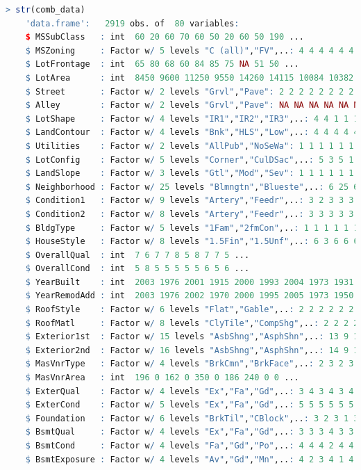 \documentclass[sigconf]{acmart}
\begin{document}
	\begin{lstlisting}[language=R]
	> str(comb_data)
	'data.frame':	2919 obs. of  80 variables:
	$ MSSubClass   : int  60 20 60 70 60 50 20 60 50 190 ...
	$ MSZoning     : Factor w/ 5 levels "C (all)","FV",..: 4 4 4 4 4 4 4 4 5 4 ...
	$ LotFrontage  : int  65 80 68 60 84 85 75 NA 51 50 ...
	$ LotArea      : int  8450 9600 11250 9550 14260 14115 10084 10382 6120 7420 ...
	$ Street       : Factor w/ 2 levels "Grvl","Pave": 2 2 2 2 2 2 2 2 2 2 ...
	$ Alley        : Factor w/ 2 levels "Grvl","Pave": NA NA NA NA NA NA NA NA NA NA ...
	$ LotShape     : Factor w/ 4 levels "IR1","IR2","IR3",..: 4 4 1 1 1 1 4 1 4 4 ...
	$ LandContour  : Factor w/ 4 levels "Bnk","HLS","Low",..: 4 4 4 4 4 4 4 4 4 4 ...
	$ Utilities    : Factor w/ 2 levels "AllPub","NoSeWa": 1 1 1 1 1 1 1 1 1 1 ...
	$ LotConfig    : Factor w/ 5 levels "Corner","CulDSac",..: 5 3 5 1 3 5 5 1 5 1 ...
	$ LandSlope    : Factor w/ 3 levels "Gtl","Mod","Sev": 1 1 1 1 1 1 1 1 1 1 ...
	$ Neighborhood : Factor w/ 25 levels "Blmngtn","Blueste",..: 6 25 6 7 14 12 21 17 18 4 ...
	$ Condition1   : Factor w/ 9 levels "Artery","Feedr",..: 3 2 3 3 3 3 3 5 1 1 ...
	$ Condition2   : Factor w/ 8 levels "Artery","Feedr",..: 3 3 3 3 3 3 3 3 3 1 ...
	$ BldgType     : Factor w/ 5 levels "1Fam","2fmCon",..: 1 1 1 1 1 1 1 1 1 2 ...
	$ HouseStyle   : Factor w/ 8 levels "1.5Fin","1.5Unf",..: 6 3 6 6 6 1 3 6 1 2 ...
	$ OverallQual  : int  7 6 7 7 8 5 8 7 7 5 ...
	$ OverallCond  : int  5 8 5 5 5 5 5 6 5 6 ...
	$ YearBuilt    : int  2003 1976 2001 1915 2000 1993 2004 1973 1931 1939 ...
	$ YearRemodAdd : int  2003 1976 2002 1970 2000 1995 2005 1973 1950 1950 ...
	$ RoofStyle    : Factor w/ 6 levels "Flat","Gable",..: 2 2 2 2 2 2 2 2 2 2 ...
	$ RoofMatl     : Factor w/ 8 levels "ClyTile","CompShg",..: 2 2 2 2 2 2 2 2 2 2 ...
	$ Exterior1st  : Factor w/ 15 levels "AsbShng","AsphShn",..: 13 9 13 14 13 13 13 7 4 9 ...
	$ Exterior2nd  : Factor w/ 16 levels "AsbShng","AsphShn",..: 14 9 14 16 14 14 14 7 16 9 ...
	$ MasVnrType   : Factor w/ 4 levels "BrkCmn","BrkFace",..: 2 3 2 3 2 3 4 4 3 3 ...
	$ MasVnrArea   : int  196 0 162 0 350 0 186 240 0 0 ...
	$ ExterQual    : Factor w/ 4 levels "Ex","Fa","Gd",..: 3 4 3 4 3 4 3 4 4 4 ...
	$ ExterCond    : Factor w/ 5 levels "Ex","Fa","Gd",..: 5 5 5 5 5 5 5 5 5 5 ...
	$ Foundation   : Factor w/ 6 levels "BrkTil","CBlock",..: 3 2 3 1 3 6 3 2 1 1 ...
	$ BsmtQual     : Factor w/ 4 levels "Ex","Fa","Gd",..: 3 3 3 4 3 3 1 3 4 4 ...
	$ BsmtCond     : Factor w/ 4 levels "Fa","Gd","Po",..: 4 4 4 2 4 4 4 4 4 4 ...
	$ BsmtExposure : Factor w/ 4 levels "Av","Gd","Mn",..: 4 2 3 4 1 4 1 3 4 4 ...

\end{lstlisting}
\end{document}
